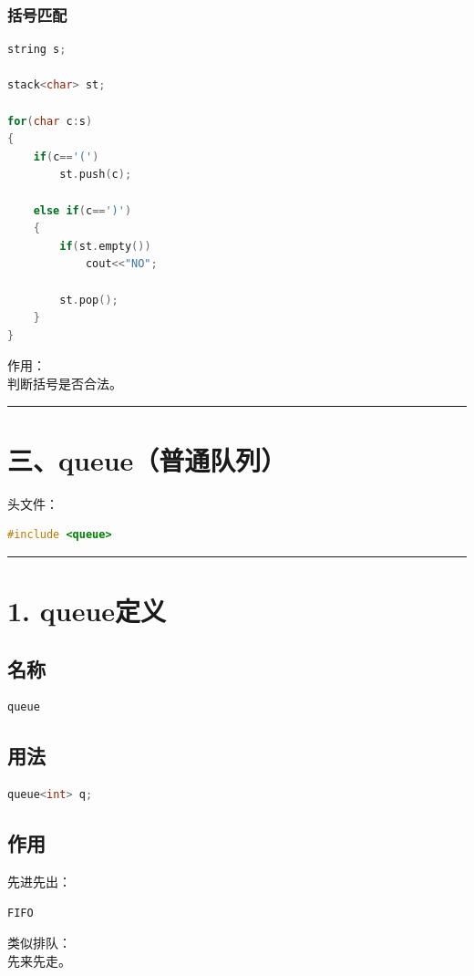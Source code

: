 \documentclass[9pt,twocolumn]{extarticle}
\begin{document}
\subsubsection{括号匹配}
\begin{lstlisting}[language=C++]
string s;

stack<char> st;

for(char c:s)
{
    if(c=='(')
        st.push(c);

    else if(c==')')
    {
        if(st.empty())
            cout<<"NO";

        st.pop();
    }
}
\end{lstlisting}
作用：\\
判断括号是否合法。

\noindent\rule{\linewidth}{0.4pt}

\section{三、queue（普通队列）}

头文件：
\begin{lstlisting}[language=C++]
#include <queue>
\end{lstlisting}

\noindent\rule{\linewidth}{0.4pt}

\section{1. queue定义}

\subsection{名称}
\begin{lstlisting}[language=C++]
queue
\end{lstlisting}

\subsection{用法}
\begin{lstlisting}[language=C++]
queue<int> q;
\end{lstlisting}

\subsection{作用}
先进先出：
\begin{lstlisting}
FIFO
\end{lstlisting}
类似排队：\\
先来先走。
\end{document}
